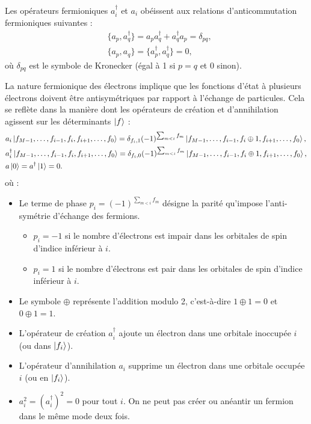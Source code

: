 \documentclass[12pt,a4paper]{article} %
\numberwithin{equation}{section} %
\numberwithin{figure}{section} %
\numberwithin{table}{section} %
\begin{document}
\bigskip

Les opérateurs fermioniques $a^\dagger_i$ et $a_i$ obéissent aux relations d'anticommutation fermioniques suivantes :
\begin{align}
\label{eq:anticommutation}
& \{a_p, a^\dagger_q\} = a_p a^\dagger_q + a^\dagger_q a_p = \delta_{pq}, \\
& \{a_p, a_q\} = \{a^\dagger_p, a^\dagger_q\} = 0,
\end{align}
où $\delta_{pq}$ est le symbole de Kronecker (égal à 1 si $p = q$ et 0 sinon).

La nature fermionique des électrons implique que les fonctions d'état à plusieurs électrons doivent être antisymétriques par rapport à l'échange de particules. Cela se reflète dans la manière dont les opérateurs de création et d'annihilation agissent sur les déterminants $\ket{f}$ :
\begin{align}
\label{eq:fermion_operators}
& a_i \ket{f_{M-1}, \dots, f_{i-1}, f_i, f_{i+1}, \dots, f_0} = \delta_{f_i, 1} (-1)^{\sum_{m < i} f_m} \ket{f_{M-1}, \dots, f_{i-1}, f_i \oplus 1, f_{i+1}, \dots, f_0}, \\
& a^\dagger_i \ket{f_{M-1}, \dots, f_{i-1}, f_i, f_{i+1}, \dots, f_0} = \delta_{f_i, 0} (-1)^{\sum_{m < i} f_m} \ket{f_{M-1}, \dots, f_{i-1}, f_i \oplus 1, f_{i+1}, \dots, f_0}, \\
& a \ket{0} = a^\dagger \ket{1} = 0.
\end{align}
où :
\begin{itemize}
    \item Le terme de phase $p_i = (-1)^{\sum_{m < i} f_m}$ désigne la parité qu'impose l'anti-symétrie d'échange des fermions.
        \begin{itemize}
            \item $p_i = -1$ si le nombre d'électrons est impair dans les orbitales de spin d'indice inférieur à $i$.
            \item $p_i = 1$ si le nombre d'électrons est pair dans les orbitales de spin d'indice inférieur à $i$.
        \end{itemize}
    \item Le symbole $\oplus$ représente l'addition modulo 2, c'est-à-dire $1 \oplus 1 = 0$ et $0 \oplus 1 = 1$.
    \item L'opérateur de création $a^\dagger_i$ ajoute un électron dans une orbitale inoccupée $i$ (ou dans $\ket{f_i}$).
    \item L'opérateur d'annihilation $a_i$ supprime un électron dans une orbitale occupée $i$ (ou en $\ket{f_i}$).
    \item $a_i^2 = (a^\dagger_i)^2 = 0$ pour tout $i$. On ne peut pas créer ou anéantir un fermion dans le même mode deux fois.
\end{itemize}
\end{document}
